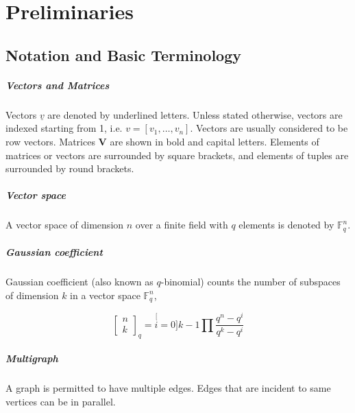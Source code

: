\chapter{Preliminaries} \label{chap:preliminaries}

\section{Notation and Basic Terminology}

\paragraph{Vectors and Matrices}

Vectors $\underline{v}$ are denoted by underlined letters. Unless
stated otherwise, vectors are indexed starting from 1, i.e. $v=\left[v_{1},\ldots,v_{n}\right]$.
Vectors are usually considered to be row vectors. Matrices $\boldsymbol{V}$
are shown in bold and capital letters. Elements of matrices or vectors
are surrounded by square brackets, and elements of tuples are surrounded
by round brackets.

\paragraph{Vector space}

A vector space of dimension $n$ over a finite field with $q$ elements
is denoted by $\ensuremath{\mathbb{F}}_{q}^{n}$. 

\paragraph{Gaussian coefficient}

Gaussian coefficient (also known as $q$-binomial) counts the number
of subspaces of dimension $k$ in a vector space $\ensuremath{\mathbb{F}}_{q}^{n}$,

\[
\left[\begin{array}{c}
n\\
k
\end{array}\right]_{q}=\stackrel[i=0]{k-1}{\prod}\frac{q^{n}-q^{i}}{q^{k}-q^{i}}
\]


\paragraph{Multigraph}

A graph is permitted to have multiple edges. Edges that are incident
to same vertices can be in parallel.

